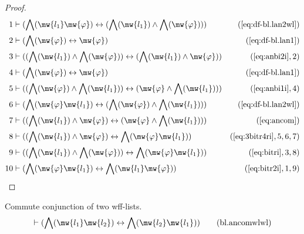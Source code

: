 \begin{proof}
\begin{align}
  1 & \vdash ( \bigwedge( \mw{l_1} \mw{\varphi} ) \leftrightarrow ( \bigwedge(
    \mw{l_1} ) \wedge \bigwedge( \mw{\varphi} ) )
    )&(\mbox{\ref{eq:df-bl.lan2wl}})\notag
  \\ 2 & \vdash ( \bigwedge( \mw{\varphi} ) \leftrightarrow \mw{\varphi}
    )&(\mbox{\ref{eq:df-bl.lan1}})\notag
  \\ 3 & \vdash ( ( \bigwedge( \mw{l_1} ) \wedge \bigwedge( \mw{\varphi} ) )
    \leftrightarrow ( \bigwedge( \mw{l_1} ) \wedge
    \mw{\varphi} ) )&(\mbox{\ref{eq:anbi2i}},2)\notag
  \\ 4 & \vdash ( \bigwedge( \mw{\varphi} ) \leftrightarrow \mw{\varphi} )&(\mbox{\ref{eq:df-bl.lan1}})\notag
  \\ 5 & \vdash ( ( \bigwedge( \mw{\varphi} ) \wedge \bigwedge( \mw{l_1} ) )
    \leftrightarrow ( \mw{\varphi} \wedge \bigwedge( \mw{l_1}
    ) ) )&(\mbox{\ref{eq:anbi1i}},4)\notag
  \\ 6 & \vdash ( \bigwedge( \mw{\varphi} \mw{l_1} ) \leftrightarrow (
    \bigwedge( \mw{\varphi} ) \wedge \bigwedge( \mw{l_1} ) )
    )&(\mbox{\ref{eq:df-bl.lan2wl}})\notag
  \\ 7 & \vdash ( ( \bigwedge( \mw{l_1} ) \wedge \mw{\varphi} ) \leftrightarrow
    ( \mw{\varphi} \wedge \bigwedge( \mw{l_1} ) )
    )&(\mbox{\ref{eq:ancom}})\notag
  \\ 8 & \vdash ( ( \bigwedge( \mw{l_1} ) \wedge \mw{\varphi} ) \leftrightarrow
    \bigwedge( \mw{\varphi} \mw{l_1} )
    )&(\mbox{\ref{eq:3bitr4ri}},5,6,7)\notag
  \\ 9 & \vdash ( ( \bigwedge( \mw{l_1} ) \wedge \bigwedge( \mw{\varphi} ) )
    \leftrightarrow \bigwedge( \mw{\varphi} \mw{l_1} )
    )&(\mbox{\ref{eq:bitri}},3,8)\notag
  \\ 10 & \vdash ( \bigwedge( \mw{\varphi} \mw{l_1} ) \leftrightarrow \bigwedge(
    \mw{l_1} \mw{\varphi} )
    )&(\mbox{\ref{eq:bitr2i}},1,9)\notag
\end{align}
\end{proof}

\begin{lemma} Commute conjunction of two wff-lists.
\begin{align}
\vdash ( \bigwedge( \mw{l_1} \mw{l_2} ) \leftrightarrow \bigwedge( \mw{l_2}
    \mw{l_1} ) )\label{eq:bl.ancomwlwl}\tag{bl.ancomwlwl}
\end{align}
\end{lemma}

